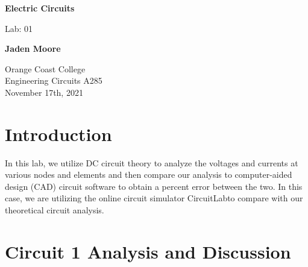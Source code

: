 \documentclass[12pt]{article}
\begin{document}

\begin{titlepage}
    \begin{center}
        \vspace*{1cm}
        \textbf{Electric Circuits}

        \vspace{0.5cm}
        Lab: 01

        \vspace{1cm}

        \textbf{Jaden Moore}

        \vfill

        Orange Coast College\\
        Engineering Circuits A285\\
        November 17th, 2021

    \end{center}
\end{titlepage}

\pagestyle{fancy}
\fancyhf{}
\setlength{\headheight}{15pt}
\cfoot{\thepage}

\section{Introduction}
In this lab, we utilize DC circuit theory to analyze the voltages and currents at various nodes and elements and then compare our analysis to computer-aided design (CAD) circuit software to obtain a percent error between the two. In this case, we are utilizing the online circuit simulator CircuitLab\textregistered\space to compare with our theoretical circuit analysis.

\section{Circuit 1 Analysis and Discussion}
\end{document}
